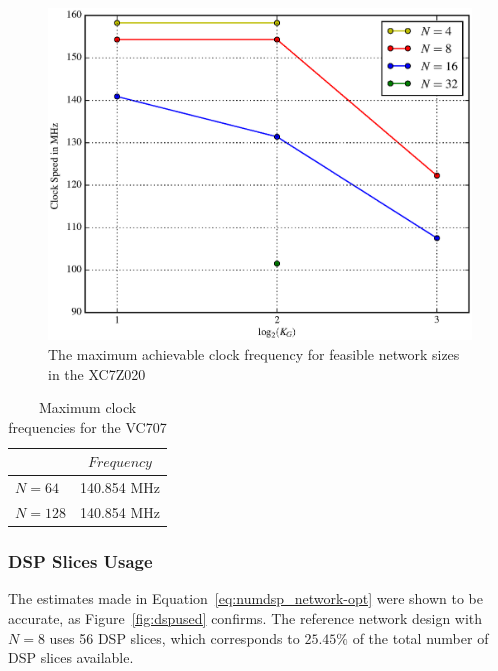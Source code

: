 \documentclass{IEEEtran}
\begin{document}
\begin{figure}
    \centering
    \includegraphics[width=\linewidth]{figures/maxfreq.eps}
    \caption{The maximum achievable clock frequency for feasible network sizes in the XC7Z020}
    \label{fig:maxfreq}
\end{figure}


\begin{table}
	\caption{Maximum clock frequencies for the VC707}
	\label{tab:maxfreq-virtx7}
    \centering
  \begin{tabular}{ | l | c | }
    \hline
     & $Frequency$  \\
    \hline
    $N=64$ & 140.854 MHz \\
    \hline
    $N=128$ & 140.854 MHz\\
    \hline
  \end{tabular}

\end{table}

\subsubsection{DSP Slices Usage}\label{sec:results_synth_dsp}
The estimates made in Equation~\ref{eq:numdsp_network-opt} were shown to be accurate, as Figure~\ref{fig:dspused} confirms.
The reference network design with $N=8$ uses 56 DSP slices, which corresponds to $25.45\%$ of the total number of DSP slices available.
\end{document}
